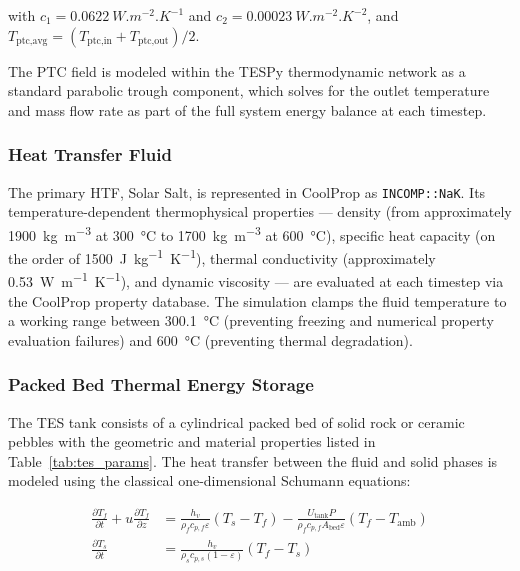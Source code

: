 \documentclass[11pt,review,3p]{elsarticle}
\begin{document}
with $c_{1} = \SI{0.0622}{W.m^{-2}.K^{-1}}$ and $c_{2} = \SI{0.00023}{W.m^{-2}.K^{-2}}$, and $T_{\text{ptc,avg}} = (T_{\text{ptc,in}} + T_{\text{ptc,out}})/2$.

The PTC field is modeled within the TESPy thermodynamic network as a standard parabolic trough component, which solves for the outlet temperature and mass flow rate as part of the full system energy balance at each timestep.

\subsubsection{Heat Transfer Fluid}
\label{sec:htf}

The primary HTF, Solar Salt, is represented in CoolProp as \texttt{INCOMP::NaK}. Its temperature-dependent thermophysical properties --- density (from approximately \SI{1900}{kg.m^{-3}} at \SI{300}{\celsius} to \SI{1700}{kg.m^{-3}} at \SI{600}{\celsius}), specific heat capacity (on the order of \SI{1500}{J.kg^{-1}.K^{-1}}), thermal conductivity (approximately \SI{0.53}{W.m^{-1}.K^{-1}}), and dynamic viscosity --- are evaluated at each timestep via the CoolProp property database. The simulation clamps the fluid temperature to a working range between \SI{300.1}{\celsius} (preventing freezing and numerical property evaluation failures) and \SI{600}{\celsius} (preventing thermal degradation).

\subsubsection{Packed Bed Thermal Energy Storage}
\label{sec:pbtes_model}

The TES tank consists of a cylindrical packed bed of solid rock or ceramic pebbles with the geometric and material properties listed in Table~\ref{tab:tes_params}. The heat transfer between the fluid and solid phases is modeled using the classical one-dimensional Schumann equations:

\begin{align}
    \frac{\partial T_f}{\partial t} + u \frac{\partial T_f}{\partial z} &= \frac{h_v}{\rho_f c_{p,f} \varepsilon} \left(T_s - T_f\right) - \frac{U_{\text{tank}} P}{\rho_f c_{p,f} A_{\text{bed}} \varepsilon} \left(T_f - T_{\text{amb}}\right) \label{eq:schumann_f} \\
    \frac{\partial T_s}{\partial t} &= \frac{h_v}{\rho_s c_{p,s} (1 - \varepsilon)} \left(T_f - T_s\right) \label{eq:schumann_s}
\end{align}
\end{document}
